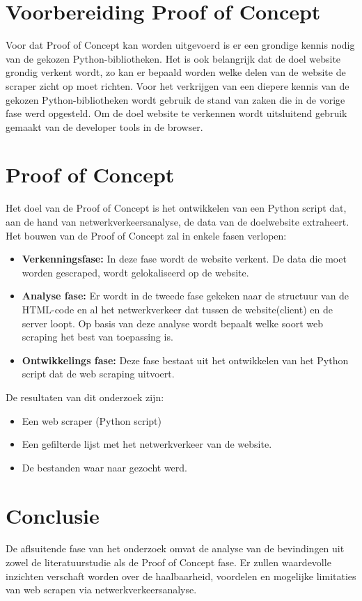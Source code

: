 \section{Voorbereiding Proof of Concept}
Voor dat Proof of Concept kan worden uitgevoerd is er een grondige kennis nodig van de gekozen Python-bibliotheken. Het is ook belangrijk dat de doel website grondig verkent wordt, zo kan er bepaald worden welke delen van de website de scraper zicht op moet richten. Voor het verkrijgen van een diepere kennis van de gekozen Python-bibliotheken wordt gebruik de stand van zaken die in de vorige fase werd opgesteld. Om de doel website te verkennen wordt uitsluitend gebruik gemaakt van de developer tools in de browser.

\section{Proof of Concept}
Het doel van de Proof of Concept is het ontwikkelen van een Python script dat, aan de hand van netwerkverkeersanalyse, de data van de doelwebsite extraheert.
Het bouwen van de Proof of Concept zal in enkele fasen verlopen:
\begin{itemize}
    \item \textbf{Verkenningsfase:} In deze fase wordt de website verkent. De data die moet worden gescraped, wordt gelokaliseerd op de website. 
    
    \item \textbf{Analyse fase:} Er wordt in de tweede fase gekeken naar de structuur van de HTML-code en al het netwerkverkeer dat tussen de website(client) en de server loopt. Op basis van deze analyse wordt bepaalt welke soort web scraping het best van toepassing is.
    
    \item \textbf{Ontwikkelings fase:} Deze fase bestaat uit het ontwikkelen van het Python script dat de web scraping uitvoert.
    
\end{itemize}
 De resultaten van dit onderzoek zijn: 
\begin{itemize}
    \item Een web scraper (Python script)
    \item Een gefilterde lijst met het netwerkverkeer van de website.
    \item De bestanden waar naar gezocht werd.
\end{itemize}

\section{Conclusie}
De aflsuitende fase van het onderzoek omvat de analyse van de bevindingen uit zowel de literatuurstudie als de Proof of Concept fase. Er zullen waardevolle inzichten verschaft worden over de haalbaarheid, voordelen en mogelijke limitaties van web scrapen via netwerkverkeersanalyse. 
